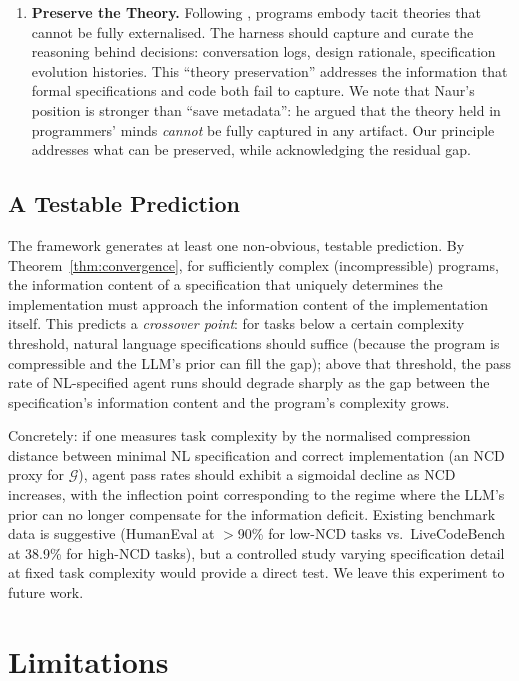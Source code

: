 \documentclass[11pt, a4paper, copyright]{googledeepmind}
\begin{document}
\begin{enumerate}
    \item \textbf{Preserve the Theory.} Following \citet{naur1985programming}, programs embody tacit theories that cannot be fully externalised. The harness should capture and curate the reasoning behind decisions: conversation logs, design rationale, specification evolution histories. This ``theory preservation'' addresses the information that formal specifications and code both fail to capture. We note that Naur's position is stronger than ``save metadata'': he argued that the theory held in programmers' minds \emph{cannot} be fully captured in any artifact. Our principle addresses what can be preserved, while acknowledging the residual gap.
\end{enumerate}

\subsection{A Testable Prediction}

The framework generates at least one non-obvious, testable prediction. By Theorem~\ref{thm:convergence}, for sufficiently complex (incompressible) programs, the information content of a specification that uniquely determines the implementation must approach the information content of the implementation itself. This predicts a \emph{crossover point}: for tasks below a certain complexity threshold, natural language specifications should suffice (because the program is compressible and the LLM's prior can fill the gap); above that threshold, the pass rate of NL-specified agent runs should degrade sharply as the gap between the specification's information content and the program's complexity grows.

Concretely: if one measures task complexity by the normalised compression distance between minimal NL specification and correct implementation (an NCD proxy for $\mathcal{G}$), agent pass rates should exhibit a sigmoidal decline as NCD increases, with the inflection point corresponding to the regime where the LLM's prior can no longer compensate for the information deficit. Existing benchmark data is suggestive (HumanEval at $>$90\% for low-NCD tasks vs.\ LiveCodeBench at 38.9\% for high-NCD tasks), but a controlled study varying specification detail at fixed task complexity would provide a direct test. We leave this experiment to future work.


\section{Limitations}
\end{document}

